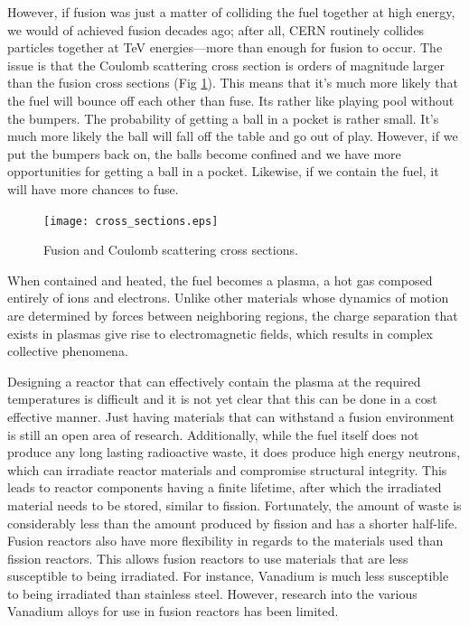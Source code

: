 However, if fusion was just a matter of colliding the fuel together at high energy, we would of achieved fusion decades ago; after all, CERN routinely collides particles together at TeV energies---more than enough for fusion to occur. The issue is that the Coulomb scattering cross section is orders of magnitude larger than the fusion cross sections (Fig \ref{fig:scattering}). This means that it's much more likely that the fuel will bounce off each other than fuse. Its rather like playing pool without the bumpers. The probability of getting a ball in a pocket is rather small. It's much more likely the ball will fall off the table and go out of play. However, if we put the bumpers back on, the balls become confined and we have more opportunities for getting a ball in a pocket. Likewise, if we contain the fuel, it will have more chances to fuse.
\begin{figure}[ht]
    \centering
    \texttt{[image: cross\_sections.eps]}
    \caption{Fusion and Coulomb scattering cross sections.}
    \label{fig:scattering}
\end{figure}
When contained and heated, the fuel becomes a plasma, a hot gas composed entirely of ions and electrons. Unlike other materials whose dynamics of motion are determined by forces between neighboring regions, the charge separation that exists in plasmas give rise to electromagnetic fields, which results in complex collective phenomena.

Designing a reactor that can effectively contain the plasma at the required temperatures is difficult and it is not yet clear that this can be done in a cost effective manner. Just having materials that can withstand a fusion environment is still an open area of research. Additionally, while the fuel itself does not produce any long lasting radioactive waste, it does produce high energy neutrons, which can irradiate reactor materials and compromise structural integrity. This leads to reactor components having a finite lifetime, after which the irradiated material needs to be stored, similar to fission. Fortunately, the amount of waste is considerably less than the amount produced by fission and has a shorter half-life. Fusion reactors also have more flexibility in regards to the materials used than fission reactors. This allows fusion reactors to use materials that are less susceptible to being irradiated. For instance, Vanadium is much less susceptible to being irradiated than stainless steel. However, research into the various Vanadium alloys for use in fusion reactors has been limited. 

